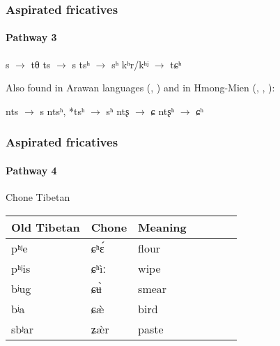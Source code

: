 \documentclass[xcolor=table]{beamer}
\newcommand{\ipa}[1]{{\phon \mbox{#1}}} %
\begin{document}
  
  

  \begin{frame} 
 \frametitle{Aspirated fricatives} 
 \framesubtitle{Pathway 3}
\begin{exe}
\ex 
\glt *s $\rightarrow$ tθ
\glt *ts $\rightarrow$ s
\glt *tsʰ $\rightarrow$ sʰ
\glt *kʰr/kʰʲ $\rightarrow$ tɕʰ
\end{exe}
\citet{wang79miaoyu}

Also found in Arawan languages (\citealt{dixon04arawa}, \citealt{dienst05kulina}) and in Hmong-Mien (\citealt{wang79miaoyu}, \citealt{ratliff10protohm}, \citealt{carveth13aspirated}):
\begin{exe}
\ex 
\glt *nts $\rightarrow$ s
\glt *ntsʰ, *tsʰ $\rightarrow$ sʰ
\glt *ntʂ $\rightarrow$ ɕ
\glt *ntʂʰ $\rightarrow$ ɕʰ
\end{exe}

  \end{frame}   



  \begin{frame} 
 \frametitle{Aspirated fricatives} 
 \framesubtitle{Pathway 4}
Chone Tibetan
\begin{table}[H] \centering
\begin{tabular}{lllllll}
\toprule
Old Tibetan&   Chone & Meaning \\
\midrule
pʰʲe & \ipa{ɕʰɛ́} & flour \\
pʰʲis & \ipa{ɕʰìː} & wipe \\
bʲug &   \ipa{ɕʉ̀} & smear \\
bʲa &   \ipa{ɕæ̀} & bird \\
sbʲar &   \ipa{ʑæ̀r} & paste \\
\bottomrule
\end{tabular}
\end{table}


 \end{frame}   
 
 
\end{document}
